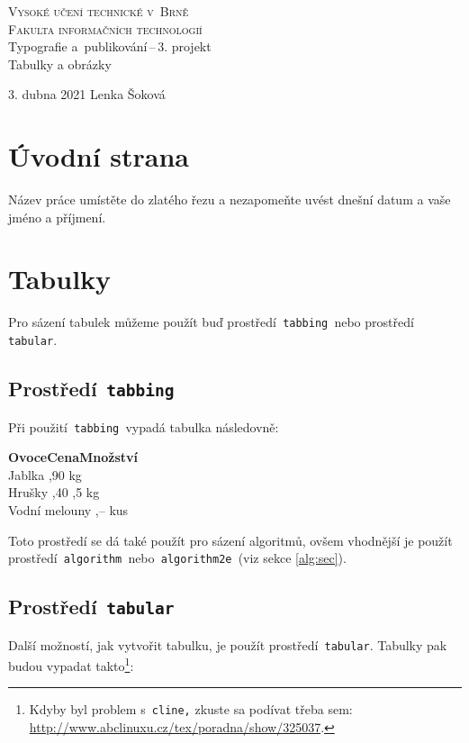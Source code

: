 \documentclass[11pt, a4paper]{article}
\begin{document}
\begin{titlepage}
\begin{center}

\Huge
\textsc {Vysoké učení technické v~Brně}\\

\huge
\textsc {Fakulta informačních technologií}\\
    \LARGE {Typografie a~publikování\,--\,3. projekt}\\
    \Huge {Tabulky a obrázky}
\end{center}


{\Large
3. dubna 2021
\hfill Lenka Šoková }
\end{titlepage}

\section{Úvodní strana}
Název práce umístěte do zlatého řezu a nezapomeňte uvést dnešní datum a vaše jméno a příjmení.

\section{Tabulky}
Pro sázení tabulek můžeme použít buď prostředí\texttt{ tabbing }nebo prostředí\texttt{ tabular}.

\subsection{Prostředí\texttt{ tabbing}}
Při použití\texttt{ tabbing }vypadá tabulka následovně:
\begin{tabbing}
\textbf{Ovoce}\hspace{0.71in}\=\textbf{Cena}\hspace{0.20in}\=\textbf{Množství}\\ %
Jablka ,90  kg\\
Hrušky ,40 ,5 kg\\
Vodní melouny ,--  kus\\
\end{tabbing}

\noindent
Toto prostředí se dá také použít pro sázení algoritmů, ovšem vhodnější je použít 
prostředí\texttt{ algorithm }nebo\texttt{ algorithm2e }(viz sekce \ref{alg:sec}).

\subsection{Prostředí\texttt{ tabular}}
Další možností, jak vytvořit tabulku, je použít prostředí\texttt{ tabular}. Tabulky pak budou vypadat takto\footnote{Kdyby byl problem s\texttt{ cline,} zkuste sa podívat třeba sem: \url{http://www.abclinuxu.cz/tex/poradna/show/325037}.}:
\bigskip
\end{document}
